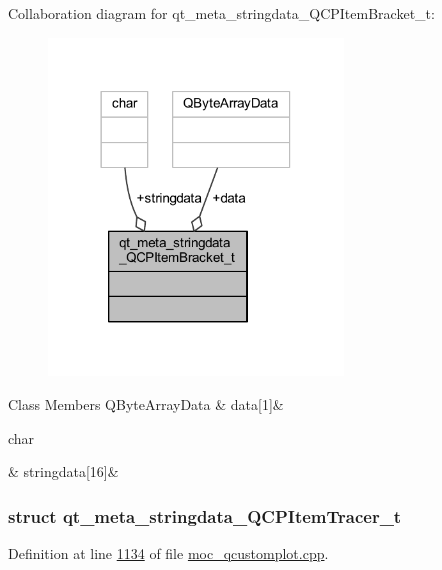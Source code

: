 Collaboration diagram for qt\+\_\+meta\+\_\+stringdata\+\_\+\+Q\+C\+P\+Item\+Bracket\+\_\+t\+:
\nopagebreak
\begin{figure}[H]
\begin{center}
\leavevmode
\includegraphics[width=222pt]{dc/d0f/a00303}
\end{center}
\end{figure}
\begin{DoxyFields}{Class Members}
\hypertarget{a00067_a15ff7a0bed3ecf746215a57a076c296b}{Q\+Byte\+Array\+Data}\label{a00067_a15ff7a0bed3ecf746215a57a076c296b}
&
data\mbox{[}1\mbox{]}&
\\
\hline

\hypertarget{a00067_a2e0cf4afc3bc921fbe6f35930bfbd9af}{char}\label{a00067_a2e0cf4afc3bc921fbe6f35930bfbd9af}
&
stringdata\mbox{[}16\mbox{]}&
\\
\hline

\end{DoxyFields}
\label{d5/df1/a00206}
\hypertarget{a00067_d5/df1/a00206}{}
\subsubsection{struct qt\+\_\+meta\+\_\+stringdata\+\_\+\+Q\+C\+P\+Item\+Tracer\+\_\+t}


Definition at line \hyperlink{a00067_source_l01134}{1134} of file \hyperlink{a00067_source}{moc\+\_\+qcustomplot.\+cpp}.



